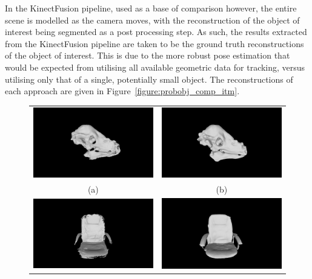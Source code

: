 In the KinectFusion pipeline, used as a base of comparison however, the entire scene is modelled 
as the camera moves, with the reconstruction of the object of interest being segmented as a post 
processing step. As such, the results extracted from the KinectFusion pipeline are taken to be the 
ground truth reconstructions of the object of interest. This is due to the more robust 
pose estimation that would be expected from utilising all available geometric data 
for tracking, versus utilising only that of a single, potentially small object. The reconstructions 
of each approach are given in Figure~\ref{figure:probobj_comp_itm}.
\begin{figure}[!htbp]
  \centering
  \begin{tabular}{cc}
    \includegraphics[width=.4\linewidth]{figures/object_recon/comp/prob/dino00.png}&
    \includegraphics[width=.4\linewidth]{figures/object_recon/comp/itm/dino00.png}\\
    (a) & (b)\\
		\includegraphics[width=.4\linewidth]{figures/object_recon/comp/prob/chair00.png}&
    \includegraphics[width=.4\linewidth]{figures/object_recon/comp/itm/chair00.png} \\

\end{tabular}
\end{figure}
